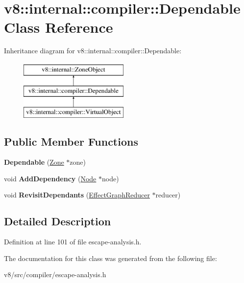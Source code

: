 \hypertarget{classv8_1_1internal_1_1compiler_1_1Dependable}{}\section{v8\+:\+:internal\+:\+:compiler\+:\+:Dependable Class Reference}
\label{classv8_1_1internal_1_1compiler_1_1Dependable}
Inheritance diagram for v8\+:\+:internal\+:\+:compiler\+:\+:Dependable\+:\begin{figure}[H]
\begin{center}
\leavevmode
\includegraphics[height=3.000000cm]{classv8_1_1internal_1_1compiler_1_1Dependable}
\end{center}
\end{figure}
\subsection*{Public Member Functions}
\begin{DoxyCompactItemize}
\item 
\mbox{\label{classv8_1_1internal_1_1compiler_1_1Dependable_a92b407d4f0bfc020352d78d772278ea1}} 
{\bfseries Dependable} (\mbox{\hyperlink{classv8_1_1internal_1_1Zone}{Zone}} $\ast$zone)
\item 
\mbox{\label{classv8_1_1internal_1_1compiler_1_1Dependable_ad1c9bbbaa7cfac1f4e7e5f5eafa96f5c}} 
void {\bfseries Add\+Dependency} (\mbox{\hyperlink{classv8_1_1internal_1_1compiler_1_1Node}{Node}} $\ast$node)
\item 
\mbox{\label{classv8_1_1internal_1_1compiler_1_1Dependable_a4bf087a378837ae5c017d57a4c77bddd}} 
void {\bfseries Revisit\+Dependants} (\mbox{\hyperlink{classv8_1_1internal_1_1compiler_1_1EffectGraphReducer}{Effect\+Graph\+Reducer}} $\ast$reducer)
\end{DoxyCompactItemize}


\subsection{Detailed Description}


Definition at line 101 of file escape-\/analysis.\+h.



The documentation for this class was generated from the following file\+:\begin{DoxyCompactItemize}
\item 
v8/src/compiler/escape-\/analysis.\+h\end{DoxyCompactItemize}
